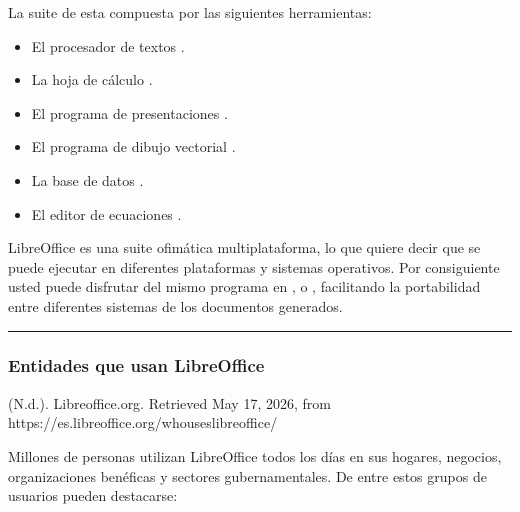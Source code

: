 \documentclass[letterpaper,10pt,spanish]{sphinxmanual}
\begin{document}
\sphinxAtStartPar
La suite de  esta compuesta por las siguientes herramientas:
\begin{itemize}
\item {} 
\sphinxAtStartPar
El procesador de textos .

\item {} 
\sphinxAtStartPar
La hoja de cálculo .

\item {} 
\sphinxAtStartPar
El programa de presentaciones .

\item {} 
\sphinxAtStartPar
El programa de dibujo vectorial .

\item {} 
\sphinxAtStartPar
La base de datos .

\item {} 
\sphinxAtStartPar
El editor de ecuaciones .

\end{itemize}

\sphinxAtStartPar
LibreOffice es una suite ofimática multi\sphinxhyphen{}plataforma, lo que quiere decir que se puede ejecutar en diferentes plataformas y sistemas operativos. Por consiguiente usted puede disfrutar del mismo programa en ,  o , facilitando la portabilidad entre diferentes sistemas de los documentos generados.


\bigskip\hrule\bigskip



\subsubsection{Entidades que usan LibreOffice}
\label{\detokenize{1_guias/10ofimatica/G1012:entidades-que-usan-libreoffice}}
\sphinxAtStartPar
%
\begin{footnote}[17]\sphinxAtStartFootnote
(N.d.). Libreoffice.org. Retrieved May 17, 2026, from https://es.libreoffice.org/who\sphinxhyphen{}uses\sphinxhyphen{}libreoffice/
%
\end{footnote} Millones de personas utilizan LibreOffice todos los días en sus hogares, negocios, organizaciones benéficas y sectores gubernamentales. De entre estos grupos de usuarios pueden destacarse:
\end{document}
